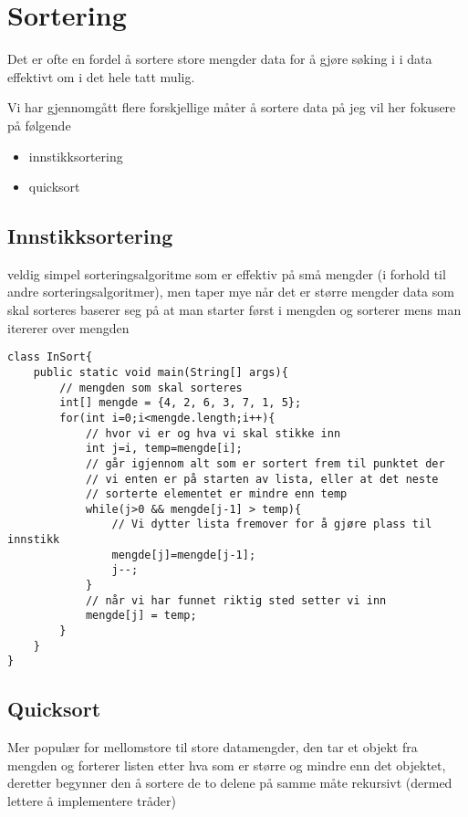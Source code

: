 \documentclass[11pt]{article}
\begin{document}
\section{Sortering}
\label{sec-12}

  Det er ofte en fordel å sortere store mengder data for å gjøre
  søking i i data effektivt om i det hele tatt mulig.

  Vi har gjennomgått flere forskjellige måter å sortere data på
  jeg vil her fokusere på følgende
\begin{itemize}
\item innstikksortering
\item quicksort
\end{itemize}
\subsection{Innstikksortering}
\label{sec-12-1}

   veldig simpel sorteringsalgoritme som er effektiv på små mengder (i forhold til andre
   sorteringsalgoritmer), men taper mye når det er større mengder data som skal sorteres
   baserer seg på at man starter først i mengden og sorterer mens man itererer over mengden


\begin{verbatim}
class InSort{
    public static void main(String[] args){
        // mengden som skal sorteres 
        int[] mengde = {4, 2, 6, 3, 7, 1, 5}; 
        for(int i=0;i<mengde.length;i++){
            // hvor vi er og hva vi skal stikke inn 
            int j=i, temp=mengde[i]; 
            // går igjennom alt som er sortert frem til punktet der 
            // vi enten er på starten av lista, eller at det neste 
            // sorterte elementet er mindre enn temp
            while(j>0 && mengde[j-1] > temp){ 
                // Vi dytter lista fremover for å gjøre plass til innstikk
                mengde[j]=mengde[j-1]; 
                j--;
            }
            // når vi har funnet riktig sted setter vi inn
            mengde[j] = temp;
        }
    }
}
\end{verbatim}
\subsection{Quicksort}
\label{sec-12-2}


   Mer populær for mellomstore til store datamengder, den tar et objekt fra mengden og
   forterer listen etter hva som er større og mindre enn det objektet, deretter begynner
   den å sortere de to delene på samme måte rekursivt (dermed lettere å implementere
   tråder)
\end{document}

